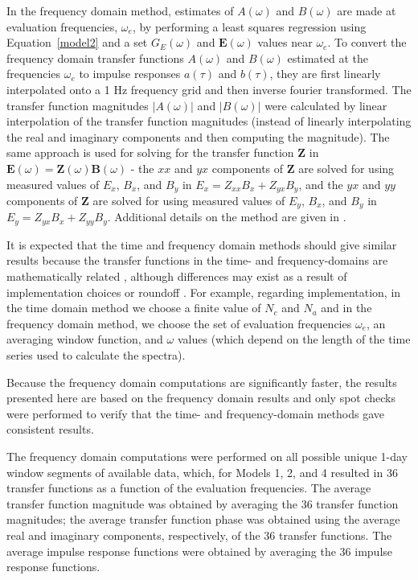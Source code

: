\documentclass[draft,linenumbers]{agujournal2018}
\begin{document}
In the frequency domain method, estimates of $A(\omega)$ and $B(\omega)$ are made at evaluation frequencies, $\omega_e$, by performing a least squares regression using Equation~\ref{model2} and a set $G_E(\omega)$ and $\mathbf{E}(\omega)$ values near $\omega_e$. To convert the frequency domain transfer functions $A(\omega)$ and $B(\omega)$ estimated at the frequencies $\omega_e$ to impulse responses $a(\tau)$ and $b(\tau)$, they are first linearly interpolated onto a 1 Hz frequency grid and then inverse fourier transformed. The transfer function magnitudes $|A(\omega)|$ and $|B(\omega)|$ were calculated by linear interpolation of the transfer function magnitudes (instead of linearly interpolating the real and imaginary components and then computing the magnitude). The same approach is used for solving for the transfer function $\mathbf{Z}$ in $\mathbf{E}(\omega) = \mathbf{Z}(\omega)\mathbf{B}(\omega)$ - the $xx$ and $yx$ components of $\mathbf{Z}$ are solved for using measured values of $E_x$, $B_x$, and $B_y$ in $E_x = Z_{xx}B_x + Z_{yx}B_{y}$, and the $yx$ and $yy$ components of $\mathbf{Z}$ are solved for using measured values of $E_y$, $B_x$, and $B_y$ in $E_y = Z_{yx}B_x + Z_{yy}B_y$. Additional details on the method are given in \cite[][and references therein.]{Weigel2017}.

It is expected that the time and frequency domain methods should give similar results because the transfer functions in the time- and frequency-domains are mathematically related \citep{Schoukens2004,Ljung2007}, although differences may exist as a result of implementation choices or roundoff \citep{Ljung2004}.  For example, regarding implementation, in the time domain method we choose a finite value of $N_c$ and $N_a$ and in the frequency domain method, we choose the set of evaluation frequencies $\omega_e$, an averaging window function, and $\omega$ values (which depend on the length of the time series used to calculate the spectra).

Because the frequency domain computations are significantly faster, the results presented here are based on the frequency domain results and only spot checks were performed to verify that the time- and frequency-domain methods gave consistent results.

The frequency domain computations were performed on all possible unique 1-day window segments of available data, which, for Models 1, 2, and 4 resulted in 36 transfer functions as a function of the evaluation frequencies. The average transfer function magnitude was obtained by averaging the 36 transfer function magnitudes; the average transfer function phase was obtained using the average real and imaginary components, respectively, of the 36 transfer functions. The average impulse response functions were obtained by averaging the 36 impulse response functions.
\end{document}
